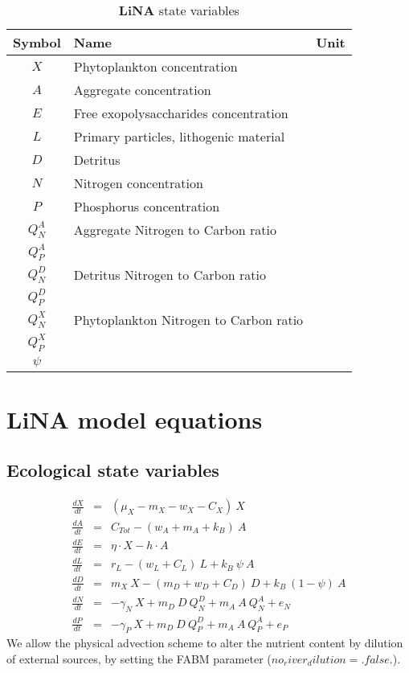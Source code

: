 \documentclass[fleqn]{article}                     %
\newcommand{\LiNA}{\textbf{LiNA} }
\begin{document}
\begin{table}[h!]
  \centering
  \caption{\LiNA state variables}
  \begin{tabular}{cll}
  \hline
    \textbf{Symbol} & \textbf{Name} & \textbf{Unit}\\ \hline
    $X$ & Phytoplankton concentration & \\
    $A$ & Aggregate concentration & \\
    $E$ & Free exopolysaccharides concentration & \\
    $L$ & Primary particles, lithogenic material & \\
    $D$ & Detritus & \\
    $N$ & Nitrogen concentration & \\
    $P$ & Phosphorus concentration & \\
    
    \hline
    $Q^A_N$ &Aggregate Nitrogen to Carbon ratio \\
    $Q^A_P$ \\
    $Q^D_N$ &Detritus Nitrogen to Carbon ratio\\
    $Q^D_P$\\
    $Q^X_N$&Phytoplankton Nitrogen to Carbon ratio\\
    $Q^X_P$\\
    $\psi$\\
  \end{tabular}
  \label{tab:stateVariables}
\end{table}


\section{\LiNA model equations}


\subsection{Ecological state variables}

\begin{eqnarray}
  \frac{dX}{dt} &=&  (\mu_X - m_X- w_X - C_X)\  X \\
  \frac{dA}{dt} &=&  C_{Tot} - (w_A + m_A + k_B) \ A\\
  \frac{dE}{dt} &=& \eta \cdot X - h\cdot A \\
  \frac{dL}{dt} &=& r_L - (w_L+C_L)\ L + k_B\ \psi\ A \\
  \frac{dD}{dt} &=& m_X \  X - (m_D + w_D + C_D)\ D + k_B\ (1-\psi)\ A \\
  \frac{dN}{dt} &=& -\gamma_N \ X + m_D\ D \  Q^D_N + m_A\ A\  Q^A_N + e_N\\
  \frac{dP}{dt} &=& -\gamma_P\  X + m_D\ D \  Q^D_P + m_A\ A\  Q^A_P + e_P
\end{eqnarray}
We allow the physical advection scheme to alter the nutrient content by dilution of external sources, by setting the FABM parameter ($no_river_dilution=.false.$).
\end{document}
